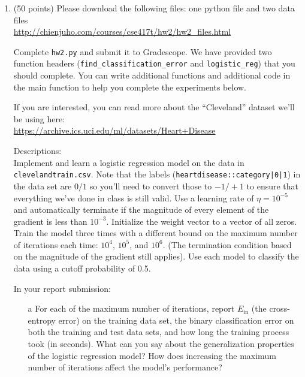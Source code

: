 \documentclass[11pt]{article}
\begin{document}
\begin{enumerate}
\item (50 points) 
    Please download the following files: one python file and two data files\\
    \url{http://chienjuho.com/courses/cse417t/hw2/hw2_files.html}


  Complete \texttt{hw2.py} and submit it to Gradescope. 
  We have provided two function headers (\texttt{find\_classification\_error} and \texttt{logistic\_reg}) that you should complete.
  You can write additional functions and additional code in the main function to help you complete the experiments below.
  
  If you are interested, you can read more about the ``Cleveland'' dataset we'll be using here:\\
    \url{https://archive.ics.uci.edu/ml/datasets/Heart+Disease}

  Descriptions:\\
  Implement and learn a logistic regression model on the data in \texttt{clevelandtrain.csv}.
  Note that the labels (\texttt{heartdisease::category|0|1}) in the data set are $0/1$ so you'll need to convert those to $-1/+1$ to ensure that everything
  we've done in class is still valid. 
  Use a learning rate of $\eta = 10^{-5}$ and automatically terminate if the magnitude of every element of the gradient is less than $10^{-3}$.
  Initialize the weight vector to a vector of all zeros. 
  Train the model three times with a different bound on the maximum number of iterations each time: $10^4$, $10^5$, and $10^6$.
   (The termination condition based on the magnitude of the gradient still applies). 
   Use each model to classify the data using a cutoff probability of 0.5.
    
   In your report submission:
   \begin{itemize}
    \item[a]
    For each of the maximum number of iterations, 
    report $E_{\text{in}}$ (the cross-entropy error) on the training data set, the binary classification error on
    both the training and test data sets, and how long the training process took (in seconds).
    What can you say about the generalization properties of the logistic regression model? 
    How does increasing the maximum number of iterations affect the model's performance?



\end{itemize}
\end{enumerate}
\end{document}
